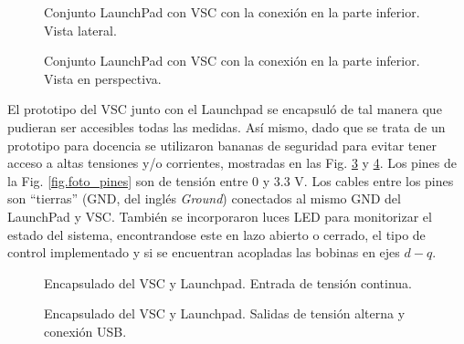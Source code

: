 \documentclass{report}
\begin{document}
\begin{figure}[!h]
    \begin{center}
        \end{center}
        \caption{Conjunto LaunchPad con VSC con la conexión en la parte inferior. Vista lateral.}
        \label{fig.conjunto_lateral}
\end{figure}

\begin{figure}[!h]
    \begin{center}
        \end{center}
        \caption{Conjunto LaunchPad con VSC con la conexión en la parte inferior. Vista en perspectiva.}
        \label{fig.conjunto_perspectiva}
\end{figure}

\clearpage

El prototipo del VSC junto con el Launchpad se encapsuló de tal manera que pudieran ser accesibles todas las medidas. Así mismo, dado que se trata de un prototipo para docencia se utilizaron bananas de seguridad para evitar tener acceso a altas tensiones y/o corrientes, mostradas en las Fig. \ref{fig.foto_entradas} y \ref{fig.foto_salidas}. Los pines de la Fig. \ref{fig.foto_pines} son de tensión entre 0 y 3.3 V. Los cables entre los pines son ``tierras'' (GND, del inglés \textit{Ground}) conectados al mismo GND del LaunchPad y VSC.
También se incorporaron luces LED para monitorizar el estado del sistema, encontrandose este en lazo abierto o cerrado, el tipo de control implementado y si se encuentran acopladas las bobinas en ejes $d-q$.

\begin{figure}[!h]
    \begin{center}
        \end{center}
        \caption{Encapsulado del VSC y Launchpad. Entrada de tensión continua.}
        \label{fig.foto_entradas}
\end{figure}

\begin{figure}[!h]
    \begin{center}
        \end{center}
        \caption{Encapsulado del VSC y Launchpad. Salidas de tensión alterna y conexión USB. }
        \label{fig.foto_salidas}
\end{figure}
\end{document}
